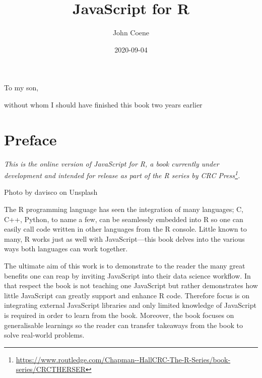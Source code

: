 \documentclass[
]{krantz}
\title{JavaScript for R}
\author{John Coene}
\date{2020-09-04}
\renewcommand{\href}[2]{#2\footnote{\url{#1}}}
\begin{document}
\maketitle


\thispagestyle{empty}

\begin{center}
To my son,

without whom I should have finished this book two years earlier
\end{center}

\setlength{\abovedisplayskip}{-5pt}
\setlength{\abovedisplayshortskip}{-5pt}

{
\hypersetup{linkcolor=}
\setcounter{tocdepth}{2}
\tableofcontents
}
\listoftables
\listoffigures
\hypertarget{preface}{%
\chapter*{Preface}\label{preface}}


\emph{This is the online version of JavaScript for R, a book currently under development and intended for release as part of the \href{https://www.routledge.com/Chapman--HallCRC-The-R-Series/book-series/CRCTHERSER}{R series by CRC Press}.}

{Photo by davisco on Unsplash}

The R programming language has seen the integration of many languages; C, C++, Python, to name a few, can be seamlessly embedded into R so one can easily call code written in other languages from the R console. Little known to many, R works just as well with JavaScript---this book delves into the various ways both languages can work together.

The ultimate aim of this work is to demonstrate to the reader the many great benefits one can reap by inviting JavaScript into their data science workflow. In that respect the book is not teaching one JavaScript but rather demonstrates how little JavaScript can greatly support and enhance R code. Therefore focus is on integrating external JavaScript libraries and only limited knowledge of JavaScript is required in order to learn from the book. Moreover, the book focuses on generalisable learnings so the reader can transfer takeaways from the book to solve real-world problems.
\end{document}
